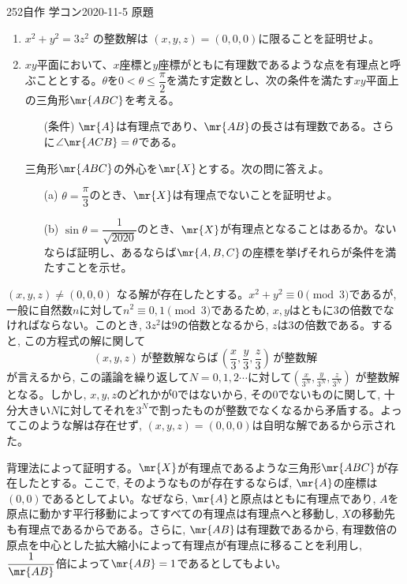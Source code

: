 \begin{thm}{252}{\maru}{自作 学コン2020-11-5 原題}
 \begin{enumerate}
  \item $x^2+y^2=3z^2$ の整数解は $(x,y,z)=(0,0,0)$に限ることを証明せよ。
  \item $xy$平面において、$x$座標と$y$座標がともに有理数であるような点を有理点と呼ぶこととする。$\theta$を$0<\theta\le\dfrac{\pi}{2}$を満たす定数とし、次の条件を満たす$xy$平面上の三角形$\mr{ABC}$を考える。
  \begin{itemize}
   \item[(条件)] $\mr{A}$は有理点であり、$\mr{AB}$の長さは有理数である。さらに$\angle\mr{ACB}=\theta$である。
  \end{itemize}
  三角形$\mr{ABC}$の外心を$\mr{X}$とする。次の問に答えよ。
  \begin{itemize}
   \item[(a)] $\theta=\dfrac{\pi}{3}$のとき、$\mr{X}$は有理点でないことを証明せよ。
   \item[(b)] $\sin\theta=\dfrac{1}{\sqrt{2020}}$のとき、$\mr{X}$が有理点となることはあるか。ないならば証明し、あるならば$\mr{A,B,C}$の座標を挙げそれらが条件を満たすことを示せ。 
  \end{itemize}
 \end{enumerate}
\end{thm}

$(x,y,z) \neq (0,0,0)$ なる解が存在したとする。$x^2 + y^2\equiv 0\pmod{3}$であるが, 一般に自然数$n$に対して$n^2\equiv 0,1\pmod{3}$であるため, $x,y$はともに$3$の倍数でなければならない。このとき, $3z^2$は$9$の倍数となるから, $z$は$3$の倍数である。すると, この方程式の解に関して
\[(x,y,z) \,\text{が整数解ならば} \,\left(\frac{x}{3}, \frac{y}{3}, \frac{z}{3}\right) \,\text{が整数解} \]
が言えるから, この議論を繰り返して$N=0,1,2\cdots$に対して$(\frac{x}{3^{N}}, \frac{y}{3^{N}}, \frac{z}{3^{N}})$ が整数解となる。しかし, $x,y,z$のどれかが$0$ではないから, その$0$でないものに関して, 十分大きい$N$に対してそれを$3^{N}$で割ったものが整数でなくなるから矛盾する。よってこのような解は存在せず, $(x,y,z) = (0,0,0)$は自明な解であるから示された。

背理法によって証明する。$\mr{X}$が有理点であるような三角形$\mr{ABC}$が存在したとする。ここで, そのようなものが存在するならば, $\mr{A}$の座標は$(0,0)$であるとしてよい。なぜなら, $\mr{A}$と原点はともに有理点であり, $A$を原点に動かす平行移動によってすべての有理点は有理点へと移動し, $X$の移動先も有理点であるからである。さらに, $\mr{AB}$は有理数であるから, 有理数倍の原点を中心とした拡大縮小によって有理点が有理点に移ることを利用し, $\dfrac{1}{\mr{AB}}$倍によって$\mr{AB}=1$であるとしてもよい。

